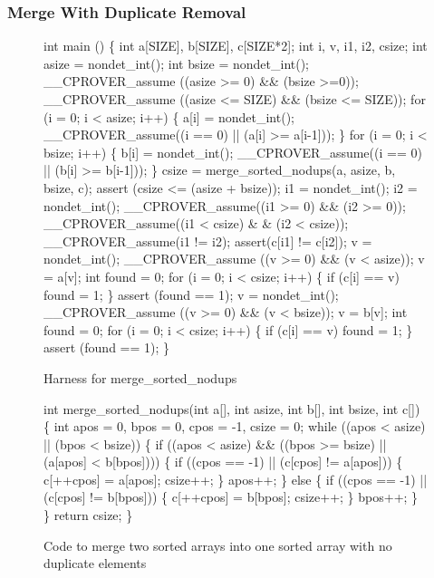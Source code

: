 \documentclass{svjour3}
\begin{document}
\subsubsection{Merge With Duplicate Removal}
\begin{figure}
{\scriptsize
\begin{code}
int main () \{
  int a[SIZE], b[SIZE], c[SIZE*2];
  int i, v, i1, i2, csize;
  int asize = nondet\_int();
  int bsize = nondet\_int();
  \_\_CPROVER\_assume ((asize >= 0) \&\& (bsize >=0));
  \_\_CPROVER\_assume ((asize <= SIZE) \&\& (bsize <= SIZE));
  for (i = 0; i < asize; i++) \{
    a[i] = nondet\_int();
    \_\_CPROVER\_assume((i == 0) || (a[i] >= a[i-1]));
  \}
  for (i = 0; i < bsize; i++) \{
    b[i] = nondet\_int();
    \_\_CPROVER\_assume((i == 0) || (b[i] >= b[i-1]));
  \}
  csize = merge\_sorted\_nodups(a, asize, b, bsize, c);
  assert (csize <= (asize + bsize));
  i1 = nondet\_int();
  i2 = nondet\_int();
  \_\_CPROVER\_assume((i1 >= 0) \&\& (i2 >= 0));
  \_\_CPROVER\_assume((i1 < csize) \& \& (i2 < csize));
  \_\_CPROVER\_assume(i1 != i2);
  assert(c[i1] != c[i2]);
  v = nondet\_int();
  \_\_CPROVER\_assume ((v >= 0) \&\& (v < asize));
  v = a[v];
  int found = 0;
  for (i = 0; i < csize; i++) \{
    if (c[i] == v)
      found = 1;
  \}
  assert (found == 1);
  v = nondet\_int();
  \_\_CPROVER\_assume ((v >= 0) \&\& (v < bsize));
  v = b[v];
  int found = 0;
  for (i = 0; i < csize; i++) \{
    if (c[i] == v)
      found = 1;
  \}
  assert (found == 1);
\}
\end{code}
}
\caption{Harness for merge\_sorted\_nodups}
\label{fig:mergeharness}
\end{figure}

\begin{figure}
{\scriptsize
\begin{code}
int merge\_sorted\_nodups(int a[], int asize, 
                        int b[], int bsize, int c[]) \{
  int apos = 0, bpos = 0, cpos = -1, csize = 0;
  while ((apos < asize) || (bpos < bsize)) \{
    if ((apos < asize) \&\& 
        ((bpos >= bsize) || (a[apos] < b[bpos]))) \{
      if ((cpos == -1) || (c[cpos] != a[apos])) \{
	c[++cpos] = a[apos];
	csize++;
      \}
      apos++;
    \} else \{
      if ((cpos == -1) || (c[cpos] != b[bpos])) \{
	c[++cpos] = b[bpos];
	csize++;
      \}
      bpos++;      
    \}
  \}
  return csize;
\}
\end{code}
}
\caption{Code to merge two sorted arrays into one sorted array with no
  duplicate elements}
\label{fig:sortnodup}
\end{figure}
\end{document}
